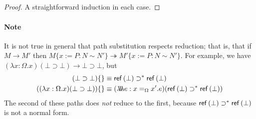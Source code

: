 \begin{lemma}
\begin{enumerate}
\begin{code}
\\
\>[12]\<[22]%
\>[22]                    \<%
\\
%
\\
\>  \AgdaSymbol{:}  \AgdaSymbol{\{} \AgdaSymbol{\}} \AgdaSymbol{(} \AgdaSymbol{:}  \AgdaSymbol{)} \AgdaSymbol{\{}   \AgdaSymbol{:}   \AgdaSymbol{\}} \AgdaSymbol{\{} \AgdaSymbol{:}   \AgdaSymbol{\}} \<%
\\
\>[12]\<[22]%
\>[22]                    \<%
\end{code}
\end{enumerate}
\end{lemma}

\begin{proof}
A straightforward induction in each case.
\end{proof}

\paragraph{Note}
It is not true in general that path substitution respects reduction; that is, that if $M \rightarrow M'$ then $M \{ x:=P : N \sim N' \} \twoheadrightarrow M' \{ x:=P : N \sim N' \}$.  For example, we have
$(\lambda x:\Omega.x)(\bot \supset \bot) \rightarrow \bot \supset \bot$,
but
\begin{align*}
(\bot \supset \bot) \{ \} & \equiv \mathsf{ref} \left( {\bot} \right) \supset^* \mathsf{ref} \left( {\bot} \right) \\
((\lambda x:\Omega.x)(\bot \supset \bot)) \{ \} & \equiv (\lambda \!\! \lambda \!\! \lambda e:x =_\Omega x'.e)(\mathsf{ref} \left( {\bot} \right) \supset^* \mathsf{ref} \left( {\bot} \right))
\end{align*}
The second of these paths does \emph{not} reduce to the first, because $\mathsf{ref} \left( {\bot} \right) \supset^* \mathsf{ref} \left( {\bot} \right)$ is not a normal form.
